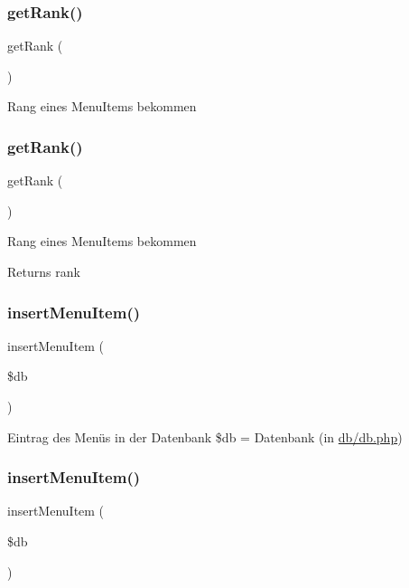 \subsubsection{\texorpdfstring{getRank()}{getRank()}\hspace{0.1cm}{\footnotesize\ttfamily [1/2]}}
{\footnotesize\ttfamily get\+Rank (\begin{DoxyParamCaption}{ }\end{DoxyParamCaption})}

Rang eines Menu\+Items bekommen \mbox{\label{classmenu_item_ad9b18cc3c110ea0dc7bd67a701d12a92}} 
\subsubsection{\texorpdfstring{getRank()}{getRank()}\hspace{0.1cm}{\footnotesize\ttfamily [2/2]}}
{\footnotesize\ttfamily get\+Rank (\begin{DoxyParamCaption}{ }\end{DoxyParamCaption})}

Rang eines Menu\+Items bekommen \begin{DoxyReturn}{Returns}
rank 
\end{DoxyReturn}
\mbox{\label{classmenu_item_a6664535b603af81a6228831db704ae33}} 
\subsubsection{\texorpdfstring{insertMenuItem()}{insertMenuItem()}\hspace{0.1cm}{\footnotesize\ttfamily [1/2]}}
{\footnotesize\ttfamily insert\+Menu\+Item (\begin{DoxyParamCaption}\item[{}]{\$db }\end{DoxyParamCaption})}

Eintrag des Menüs in der Datenbank \$db = Datenbank (in \mbox{\hyperlink{db_8php}{db/db.\+php}}) \mbox{\label{classmenu_item_a6664535b603af81a6228831db704ae33}} 
\subsubsection{\texorpdfstring{insertMenuItem()}{insertMenuItem()}\hspace{0.1cm}{\footnotesize\ttfamily [2/2]}}
{\footnotesize\ttfamily insert\+Menu\+Item (\begin{DoxyParamCaption}\item[{}]{\$db }\end{DoxyParamCaption})}


